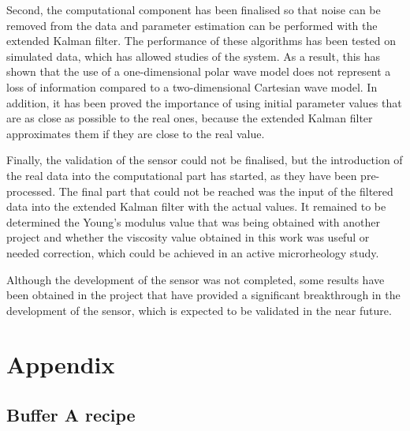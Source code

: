 \documentclass[12pt, a4paper]{article} %
\begin{document}
	Second, the computational component has been finalised so that noise can be removed from the data and parameter estimation can be performed with the extended Kalman filter. The performance of these algorithms has been tested on simulated data, which has allowed studies of the system. As a result, this has shown that the use of a one-dimensional polar wave model does not represent a loss of information compared to a two-dimensional Cartesian wave model. 
	In addition, it has been proved the importance of using initial parameter values that are as close as possible to the real ones, because the extended Kalman filter approximates them if they are close to the real value.
	
	Finally, the validation of the sensor could not be finalised, but the introduction of the real data into the computational part has started, as they have been pre-processed. The final part that could not be reached was the input of the filtered data into the extended Kalman filter with the actual values. It remained to be determined the Young's modulus value that was being obtained with another project and whether the viscosity value obtained in this work was useful or needed correction, which could be achieved in an active microrheology study. 
	
	Although the development of the sensor was not completed, some results have been obtained in the project that have provided a significant breakthrough in the development of the sensor, which is expected to be validated in the near future.
	
	\newpage
	\setlength{\parskip}{0mm}
	
	\pagestyle{empty}
	
	
	
	\newpage
	\setlength{\parskip}{0mm}
	\section{Appendix}
	
	\subsection{Buffer A recipe}
	
\end{document}
